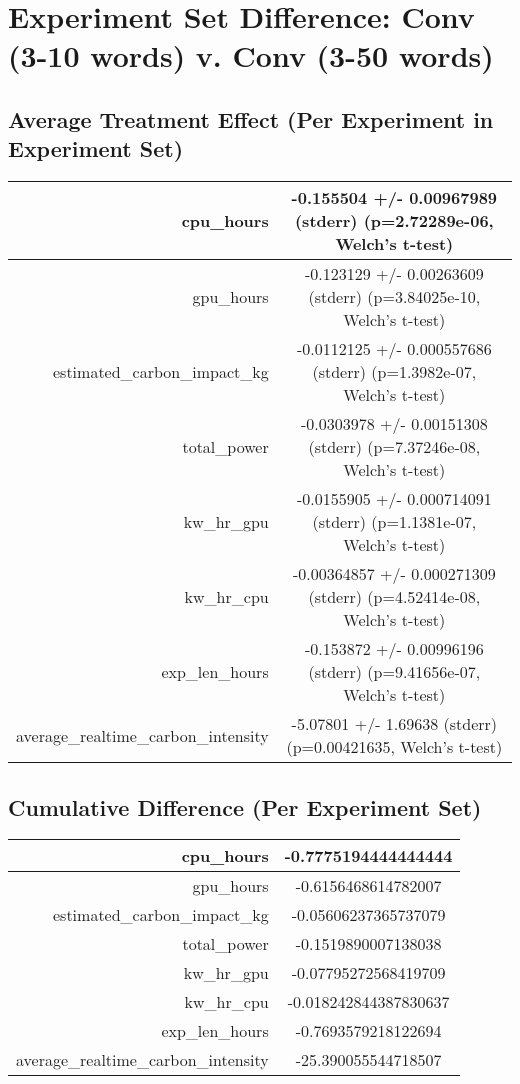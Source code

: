 \documentclass{article}%
\begin{document}
%
\normalsize%
\section{Experiment Set Difference: Conv (3{-}10 words) v. Conv (3{-}50 words)}%
\label{sec:Experiment Set Difference Conv (3{-}10 words) v. Conv (3{-}50 words)}%
\subsection{Average Treatment Effect (Per Experiment in Experiment Set)}%
\label{subsec:Average Treatment Effect (Per Experiment in Experiment Set)}%
\begin{tabular}{|r|c|}%
\hline%
cpu\_hours&{-}0.155504 +/{-} 0.00967989 (stderr) (p=2.72289e{-}06, Welch's t{-}test)\\%
\hline%
gpu\_hours&{-}0.123129 +/{-} 0.00263609 (stderr) (p=3.84025e{-}10, Welch's t{-}test)\\%
\hline%
estimated\_carbon\_impact\_kg&{-}0.0112125 +/{-} 0.000557686 (stderr) (p=1.3982e{-}07, Welch's t{-}test)\\%
\hline%
total\_power&{-}0.0303978 +/{-} 0.00151308 (stderr) (p=7.37246e{-}08, Welch's t{-}test)\\%
\hline%
kw\_hr\_gpu&{-}0.0155905 +/{-} 0.000714091 (stderr) (p=1.1381e{-}07, Welch's t{-}test)\\%
\hline%
kw\_hr\_cpu&{-}0.00364857 +/{-} 0.000271309 (stderr) (p=4.52414e{-}08, Welch's t{-}test)\\%
\hline%
exp\_len\_hours&{-}0.153872 +/{-} 0.00996196 (stderr) (p=9.41656e{-}07, Welch's t{-}test)\\%
\hline%
average\_realtime\_carbon\_intensity&{-}5.07801 +/{-} 1.69638 (stderr) (p=0.00421635, Welch's t{-}test)\\%
\hline%
\end{tabular}

%
\subsection{Cumulative Difference (Per Experiment Set)}%
\label{subsec:Cumulative Difference (Per Experiment Set)}%
\begin{tabular}{|r|c|}%
\hline%
cpu\_hours&{-}0.7775194444444444\\%
\hline%
gpu\_hours&{-}0.6156468614782007\\%
\hline%
estimated\_carbon\_impact\_kg&{-}0.05606237365737079\\%
\hline%
total\_power&{-}0.1519890007138038\\%
\hline%
kw\_hr\_gpu&{-}0.07795272568419709\\%
\hline%
kw\_hr\_cpu&{-}0.018242844387830637\\%
\hline%
exp\_len\_hours&{-}0.7693579218122694\\%
\hline%
average\_realtime\_carbon\_intensity&{-}25.390055544718507\\%
\hline%
\end{tabular}

%
\end{document}
